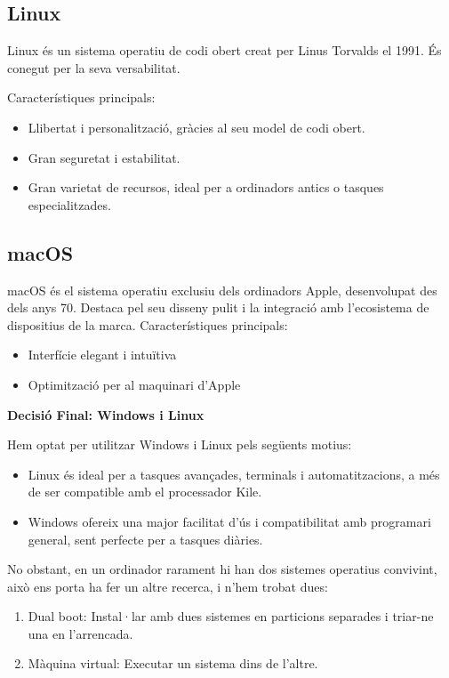 \subsection{Linux}

\label{subsec:Linux}
Linux és un sistema operatiu de codi obert creat per Linus Torvalds el 1991. És conegut per la seva versabilitat.

Característiques principals:
\begin{itemize}
 \item Llibertat i personalització, gràcies al seu model de codi obert.
 \item Gran seguretat i estabilitat.
 \item Gran varietat de  recursos, ideal per a ordinadors antics o tasques especialitzades.
\end{itemize}


\subsection{macOS}

\label{subsec:Mac OS}
macOS és el sistema operatiu exclusiu dels ordinadors Apple, desenvolupat des dels anys 70. Destaca pel seu disseny pulit i la integració amb l'ecosistema de dispositius de la marca.
Característiques principals:
\begin{itemize}
 \item Interfície elegant i intuïtiva
 \item Optimització per al maquinari d'Apple
\end{itemize}

\textbf{Decisió Final: Windows i Linux}

Hem optat per utilitzar Windows i Linux pels següents motius:
\begin{itemize}
\item Linux és ideal per a tasques avançades, terminals i automatitzacions, a més de ser compatible amb el processador Kile.

\item Windows ofereix una major facilitat d'ús i compatibilitat amb programari general, sent perfecte per a tasques diàries.
\end{itemize}

No obstant, en un ordinador rarament hi han dos sistemes operatius convivint, això ens porta ha fer un altre recerca, i n'hem trobat dues:
\begin{enumerate}
 \item Dual boot: Instal·lar amb dues sistemes en particions separades i triar-ne una en l’arrencada.
 \item Màquina virtual: Executar un sistema dins de l’altre.
\end{enumerate}

